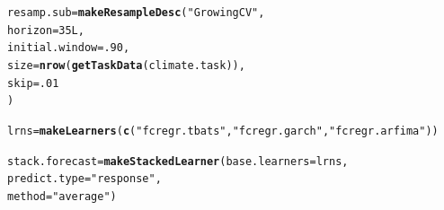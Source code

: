\documentclass{article}\usepackage[]{graphicx}\usepackage[]{color}
\makeatletter
\newcommand{\hlnum}[1]{\textcolor[rgb]{0.686,0.059,0.569}{#1}}%
\newcommand{\hlstr}[1]{\textcolor[rgb]{0.192,0.494,0.8}{#1}}%
\newcommand{\hlstd}[1]{\textcolor[rgb]{0.345,0.345,0.345}{#1}}%
\newcommand{\hlkwb}[1]{\textcolor[rgb]{0.69,0.353,0.396}{#1}}%
\newcommand{\hlkwc}[1]{\textcolor[rgb]{0.333,0.667,0.333}{#1}}%
\newcommand{\hlkwd}[1]{\textcolor[rgb]{0.737,0.353,0.396}{\textbf{#1}}}%
\newenvironment{kframe}{%
 \def\at@end@of@kframe{}%
 \ifinner\ifhmode%
  \def\at@end@of@kframe{\end{minipage}}%
  \begin{minipage}{\columnwidth}%
 \fi\fi%
 \def\FrameCommand##1{\hskip\@totalleftmargin \hskip-\fboxsep
 \colorbox{shadecolor}{##1}\hskip-\fboxsep
     \hskip-\linewidth \hskip-\@totalleftmargin \hskip\columnwidth}%
 \MakeFramed {\advance\hsize-\width
   \@totalleftmargin\z@ \linewidth\hsize
   \@setminipage}}%
 {\par\unskip\endMakeFramed%
 \at@end@of@kframe}
\newenvironment{knitrout}{}{} %
\theoremstyle{definition}
\makeatother
\begin{document}
\begin{knitrout}
\color{fgcolor}\begin{kframe}
\begin{alltt}
\hlstd{resamp.sub} \hlkwb{=} \hlkwd{makeResampleDesc}\hlstd{(}\hlstr{"GrowingCV"}\hlstd{,}
                          \hlkwc{horizon} \hlstd{=} \hlnum{35L}\hlstd{,}
                          \hlkwc{initial.window} \hlstd{=} \hlnum{.90}\hlstd{,}
                          \hlkwc{size} \hlstd{=} \hlkwd{nrow}\hlstd{(}\hlkwd{getTaskData}\hlstd{(climate.task)),}
                          \hlkwc{skip} \hlstd{=} \hlnum{.01}
                          \hlstd{)}

\hlstd{lrns} \hlkwb{=} \hlkwd{makeLearners}\hlstd{(}\hlkwd{c}\hlstd{(}\hlstr{"fcregr.tbats"}\hlstd{,}\hlstr{"fcregr.garch"}\hlstd{,} \hlstr{"fcregr.arfima"}\hlstd{))}


\hlstd{stack.forecast} \hlkwb{=} \hlkwd{makeStackedLearner}\hlstd{(}\hlkwc{base.learners} \hlstd{= lrns,}
                       \hlkwc{predict.type} \hlstd{=} \hlstr{"response"}\hlstd{,}
                       \hlkwc{method} \hlstd{=} \hlstr{"average"}\hlstd{)}


\end{alltt}
\end{kframe}
\end{knitrout}
\end{document}
